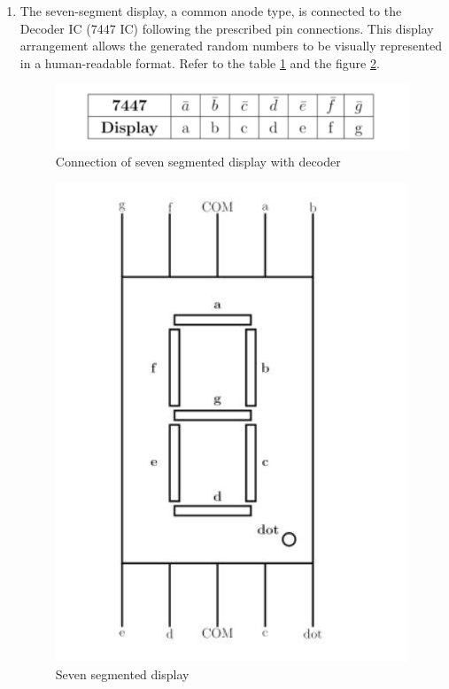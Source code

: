 \documentclass[journal,12pt,twocolumn]{IEEEtran}
\begin{document}
\begin{enumerate}
	\item The seven-segment display, a common anode type, is connected to the Decoder IC (7447 IC) following the prescribed pin connections. This display arrangement allows the generated random numbers to be visually represented in a human-readable format. Refer to the table \ref{table} and the figure \ref{SSD}.
	\begin{figure}[h]
		\includegraphics[width=\linewidth]{images/fig02.jpg}
		\caption{Connection of seven segmented display with decoder}
		\label{table}
	\end{figure}
	\begin{figure}[h]
		\includegraphics[width=\linewidth]{images/fig05.jpg}
		\caption{Seven segmented display}
		\label{SSD}
	\end{figure}


\end{enumerate}
\end{document}
